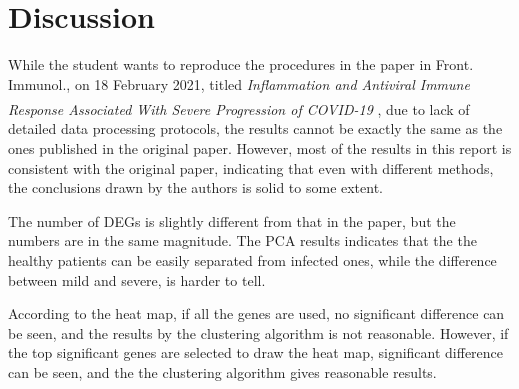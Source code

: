 \documentclass[en,black,12pt,normal]{elegantnote}
\newcommand{\upcite}[1]{\textsuperscript{\textsuperscript{\cite{#1}}}}
\begin{document}
\section{Discussion}
While the student wants to reproduce the procedures in the paper in Front. Immunol., on 18 February 2021, titled \textit{Inflammation and Antiviral Immune Response Associated With Severe Progression of COVID-19}\upcite{fimmu2021} , due to lack of detailed data processing protocols, the results cannot be exactly the same as the ones published in the original paper. However, most of the results in this report is consistent with the original paper, indicating that even with different methods, the conclusions drawn by the authors is solid to some extent.

The number of DEGs is slightly different from that in the paper, but the numbers are in the same magnitude. The PCA results indicates that the the healthy patients can be easily separated from infected ones, while the difference between mild and severe, is harder to tell.

According to the heat map, if all the genes are used, no significant difference can be seen, and the results by the clustering algorithm is not reasonable. However, if the top significant genes are selected to draw the heat map, significant difference can be seen, and the the clustering algorithm gives reasonable results.


{}
\end{document}
